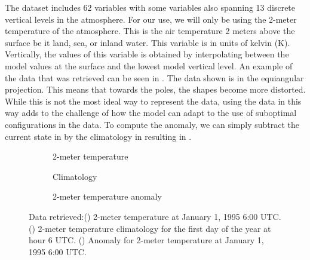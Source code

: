 The dataset includes 62 variables with some variables also spanning 13 discrete vertical levels in the atmosphere. For our use, we will only be using the 2-meter temperature of the atmosphere. This is the air temperature 2 meters above the surface be it land, sea, or inland water. This variable is in units of kelvin (K). Vertically, the values of this variable is obtained by interpolating between the model values at the surface and the lowest model vertical level. An example of the data that was retrieved can be seen in . The data shown is in the equiangular projection. This means that towards the poles, the shapes become more distorted. While this is not the most ideal way to represent the data, using the data in this way adds to the challenge of how the model can adapt to the use of suboptimal configurations in the data. To compute the anomaly, we can simply subtract the current state in  by the climatology in  resulting in .
\begin{figure}[H]
  \centering
  \begin{subfigure}{\linewidth}
    \begin{adjustbox}{width=\linewidth}
      
    \end{adjustbox}
    \caption{2-meter temperature}\label{fig:wb2_train_data}
  \end{subfigure}
  \begin{subfigure}{\linewidth}
    \begin{adjustbox}{width=\linewidth}
      
    \end{adjustbox}
    \caption{Climatology}\label{fig:wb2_clim_data}
  \end{subfigure}
  \begin{subfigure}{\linewidth}
    \begin{adjustbox}{width=\linewidth}
      
    \end{adjustbox}
    \caption{2-meter temperature anomaly}\label{fig:wb2_train_anomaly}
  \end{subfigure}
  \caption{Data retrieved:() 2-meter temperature at January 1, 1995 6:00 UTC\@. () 2-meter temperature climatology for the first day of the year at hour 6 UTC\@. () Anomaly for 2-meter temperature at January 1, 1995 6:00 UTC\@.}\label{fig:wb2_data}
\end{figure}

